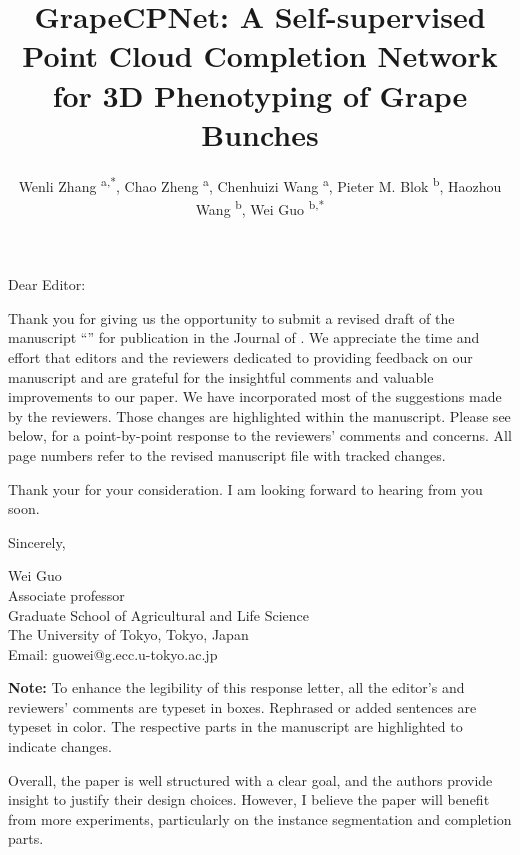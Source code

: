 \documentclass{ar2rc}
\title{GrapeCPNet: A Self-supervised Point Cloud Completion Network for 3D Phenotyping of Grape Bunches}
\author{
    Wenli Zhang \textsuperscript{a,*},
    Chao Zheng \textsuperscript{a},
    Chenhuizi Wang \textsuperscript{a},
    Pieter M. Blok \textsuperscript{b},
    Haozhou Wang \textsuperscript{b},
    Wei Guo \textsuperscript{b,*}
}
\begin{document}
\begin{center}
    \maketitle
\end{center}

\thedate

Dear Editor:

Thank you for giving us the opportunity to submit a revised draft of the manuscript ``\thetitle'' for publication in the Journal of \thejournal. We appreciate the time and effort that editors and the reviewers dedicated to providing feedback on our manuscript and are grateful for the insightful comments and valuable improvements to our paper. We have incorporated most of the suggestions made by the reviewers. Those changes are highlighted within the manuscript. Please see below, for a point-by-point response to the reviewers' comments and concerns. All page numbers refer to the revised manuscript file with tracked changes.

Thank your for your consideration. I am looking forward to hearing from you soon.

Sincerely,

Wei Guo\\
Associate professor\\
Graduate School of Agricultural and Life Science\\
The University of Tokyo, Tokyo, Japan\\
Email: guowei@g.ecc.u-tokyo.ac.jp

\vfill
\textbf{Note:} To enhance the legibility of this response letter, all the editor's and reviewers' comments are typeset in boxes. Rephrased or added sentences are typeset in color. The respective parts in the manuscript are highlighted to indicate changes.

\editor

\begin{reviewercomment}
    Overall, the paper is well structured with a clear goal,  and the authors provide insight to justify their design choices. However, I believe the paper will benefit from  more experiments, particularly on the instance segmentation and  completion parts.
\end{reviewercomment}

\end{document}
